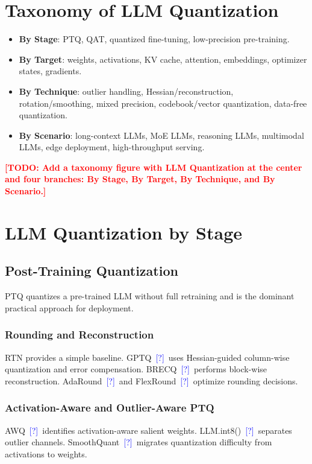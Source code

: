 \documentclass[journal,10pt]{IEEEtran}
\newcommand{\TODO}[1]{\textcolor{red}{\textbf{[TODO: #1]}}}
\newcommand{\CITE}{\textcolor{blue}{[?]}}
\begin{document}
\section{Taxonomy of LLM Quantization}

\begin{itemize}[leftmargin=*,nosep]
  \item \textbf{By Stage}: PTQ, QAT, quantized fine-tuning, low-precision pre-training.
  \item \textbf{By Target}: weights, activations, KV cache, attention, embeddings, optimizer states, gradients.
  \item \textbf{By Technique}: outlier handling, Hessian/reconstruction, rotation/smoothing, mixed precision, codebook/vector quantization, data-free quantization.
  \item \textbf{By Scenario}: long-context LLMs, MoE LLMs, reasoning LLMs, multimodal LLMs, edge deployment, high-throughput serving.
\end{itemize}

\TODO{Add a taxonomy figure with LLM Quantization at the center and four branches: By Stage, By Target, By Technique, and By Scenario.}

\section{LLM Quantization by Stage}

\subsection{Post-Training Quantization}
PTQ quantizes a pre-trained LLM without full retraining and is the dominant practical approach for deployment.

\subsubsection{Rounding and Reconstruction}
RTN provides a simple baseline. GPTQ~\CITE\ uses Hessian-guided column-wise quantization and error compensation. BRECQ~\CITE\ performs block-wise reconstruction. AdaRound~\CITE\ and FlexRound~\CITE\ optimize rounding decisions.

\subsubsection{Activation-Aware and Outlier-Aware PTQ}
AWQ~\CITE\ identifies activation-aware salient weights. LLM.int8()~\CITE\ separates outlier channels. SmoothQuant~\CITE\ migrates quantization difficulty from activations to weights.
\end{document}
